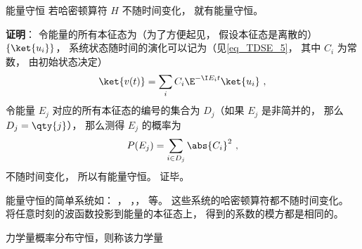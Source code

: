 \begin{theorem}{能量守恒}
若哈密顿算符 $H$ 不随时间变化， 就有能量守恒。
\end{theorem}
\textbf{证明}： 令能量的所有本征态为（为了方便起见， 假设本征态是离散的） $\{\ket{u_i}\}$， 系统状态随时间的演化可以记为（见\autoref{eq_TDSE_5}， 其中 $C_i$ 为常数， 由初始状态决定）
\begin{equation}
\ket{v(t)} = \sum_i C_i \E^{-\I E_i t} \ket{u_i}~,
\end{equation}
令能量 $E_j$ 对应的所有本征态的编号的集合为 $D_j$（如果 $E_j$ 是非简并的， 那么 $D_j = \qty{j}$），%
那么测得 $E_j$ 的概率为
\begin{equation}
P(E_j) = \sum_{i \in D_j} \abs{C_i}^2~,
\end{equation}
不随时间变化， 所以有能量守恒。 证毕。

\begin{example}{}
能量守恒的简单系统如： ， ，， 等。 这些系统的哈密顿算符都不随时间变化。 将任意时刻的波函数投影到能量的本征态上， 得到的系数的模方都是相同的。
\end{example}

\begin{definition}{}
力学量概率分布守恒，则称该力学量
\end{definition}
